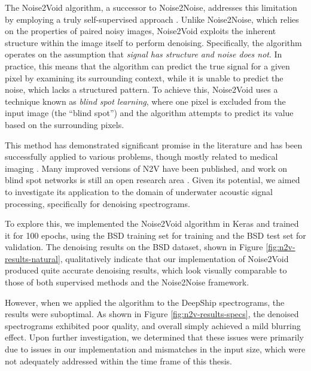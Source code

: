 The Noise2Void algorithm, a successor to Noise2Noise, addresses this limitation by employing a truly self-supervised approach \cite{krull_noise2void_2019}. Unlike Noise2Noise, which relies on the properties of paired noisy images, Noise2Void exploits the inherent structure within the image itself to perform denoising. Specifically, the algorithm operates on the assumption that \textit{signal has structure and noise does not}. In practice, this means that the algorithm can predict the true signal for a given pixel by examining its surrounding context, while it is unable to predict the noise, which lacks a structured pattern. To achieve this, Noise2Void uses a technique known as \textit{blind spot learning}, where one pixel is excluded from the input image (the ``blind spot'') and the algorithm attempts to predict its value based on the surrounding pixels.

This method has demonstrated significant promise in the literature and has been successfully applied to various problems, though mostly related to medical imaging \cite{ashwini_denoising_2023, liu_lightweight_2022, kojima_denoising_2022, song_noise2void_2021, song_noise2void_2020}. Many improved versions of N2V have been published, and work on blind spot networks is still an open research area \cite{krull_probabilistic_2019, laine_high-quality_2019, hock_n2v2_2022, zhang_unleashing_2024}. Given its potential, we aimed to investigate its application to the domain of underwater acoustic signal processing, specifically for denoising spectrograms.

To explore this, we implemented the Noise2Void algorithm in Keras and trained it for 100 epochs, using the BSD training set for training and the BSD test set for validation. The denoising results on the BSD dataset, shown in Figure \ref{fig:n2v-results-natural}, qualitatively indicate that our implementation of Noise2Void produced quite accurate denoising results, which look visually comparable to those of both supervised methods and the Noise2Noise framework.

However, when we applied the algorithm to the DeepShip spectrograms, the results were suboptimal. As shown in Figure \ref{fig:n2v-results-specs}, the denoised spectrograms exhibited poor quality, and overall simply achieved a mild blurring effect. Upon further investigation, we determined that these issues were primarily due to issues in our implementation and mismatches in the input size, which were not adequately addressed within the time frame of this thesis.

